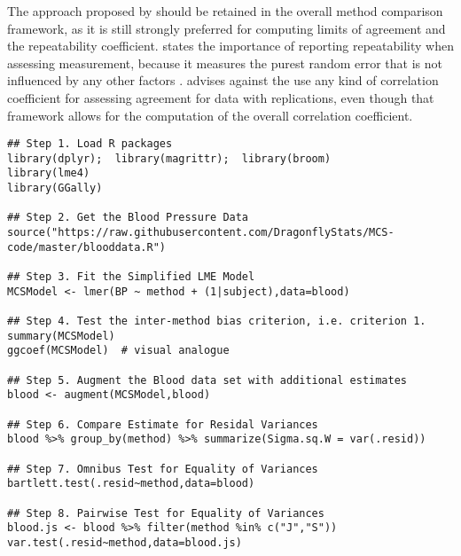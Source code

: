 \documentclass[12pt, a4paper]{report}
\theoremstyle{plain}
\theoremstyle{definition}
\theoremstyle{remark}
\begin{document}
The approach proposed by \citet{ARoy2009} should be retained in the overall method comparison framework, as it is still strongly preferred for computing limits of agreement and the repeatability coefficient.
\citet{ARoy2009} states the importance of reporting repeatability when assessing measurement, because it measures the purest
random error that is not influenced by any other factors \citep{Barnhart}.
\citet{ARoy2009} advises against the use any kind of correlation coefficient for assessing agreement for data with replications, even though that framework allows for the computation of the overall correlation coefficient.



\newpage

\begin{verbatim}
## Step 1. Load R packages
library(dplyr);  library(magrittr);  library(broom)
library(lme4)
library(GGally)

## Step 2. Get the Blood Pressure Data
source("https://raw.githubusercontent.com/DragonflyStats/MCS-code/master/blooddata.R")

## Step 3. Fit the Simplified LME Model
MCSModel <- lmer(BP ~ method + (1|subject),data=blood)

## Step 4. Test the inter-method bias criterion, i.e. criterion 1.
summary(MCSModel)
ggcoef(MCSModel)  # visual analogue

## Step 5. Augment the Blood data set with additional estimates
blood <- augment(MCSModel,blood)

## Step 6. Compare Estimate for Residal Variances
blood %>% group_by(method) %>% summarize(Sigma.sq.W = var(.resid)) 

## Step 7. Omnibus Test for Equality of Variances
bartlett.test(.resid~method,data=blood)

## Step 8. Pairwise Test for Equality of Variances
blood.js <- blood %>% filter(method %in% c("J","S"))
var.test(.resid~method,data=blood.js)

\end{verbatim}



\end{document}

